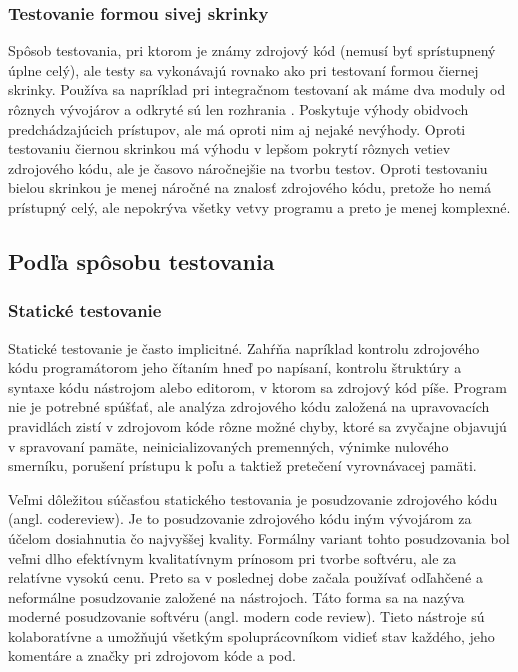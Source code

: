 \documentclass[11pt,twoside,slovak,a4paper]{article}
\begin{document}
		\subsubsection{Testovanie formou sivej skrinky} 
			Spôsob testovania, pri ktorom je známy zdrojový kód (nemusí byť sprístupnený úplne celý), ale testy sa vykonávajú rovnako ako pri testovaní formou čiernej skrinky. Používa sa napríklad pri integračnom testovaní ak máme dva moduly od rôznych vývojárov a odkryté sú len rozhrania \cite{EST2002}. Poskytuje výhody obidvoch predchádzajúcich prístupov, ale má oproti nim aj nejaké nevýhody. Oproti testovaniu čiernou skrinkou má výhodu v lepšom pokrytí rôznych vetiev zdrojového kódu, ale je časovo náročnejšie na tvorbu testov. Oproti testovaniu bielou skrinkou je menej náročné na znalosť zdrojového kódu, pretože ho nemá prístupný celý, ale nepokrýva všetky vetvy programu a preto je menej komplexné.
	
	\subsection{Podľa spôsobu testovania}
		\subsubsection{Statické testovanie}
			Statické testovanie je často implicitné. Zahŕňa napríklad kontrolu zdrojového kódu programátorom jeho čítaním hneď po napísaní, kontrolu štruktúry a syntaxe kódu nástrojom alebo editorom, v ktorom sa zdrojový kód píše. Program nie je potrebné spúšťať, ale analýza zdrojového kódu založená na upravovacích pravidlách zistí v zdrojovom kóde rôzne možné chyby, ktoré sa zvyčajne objavujú v spravovaní pamäte, neinicializovaných premenných, výnimke nulového smerníku, porušení prístupu k poľu a taktiež pretečení vyrovnávacej pamäti\cite{Wei2014}.
			
			Veľmi dôležitou súčasťou statického testovania je posudzovanie zdrojového kódu (angl. codereview). Je to posudzovanie zdrojového kódu iným vývojárom za účelom dosiahnutia čo najvyššej kvality. Formálny variant tohto posudzovania bol veľmi dlho efektívnym kvalitatívnym prínosom pri tvorbe softvéru, ale za relatívne vysokú cenu. Preto sa v poslednej dobe začala používať odľahčené a neformálne posudzovanie založené na nástrojoch. Táto forma sa na nazýva moderné posudzovanie softvéru (angl. modern code review). Tieto nástroje sú kolaboratívne a umožňujú všetkým spoluprácovníkom vidieť stav každého, jeho komentáre a značky pri zdrojovom kóde a pod.\cite{Bosu2015} 
			
\end{document}
